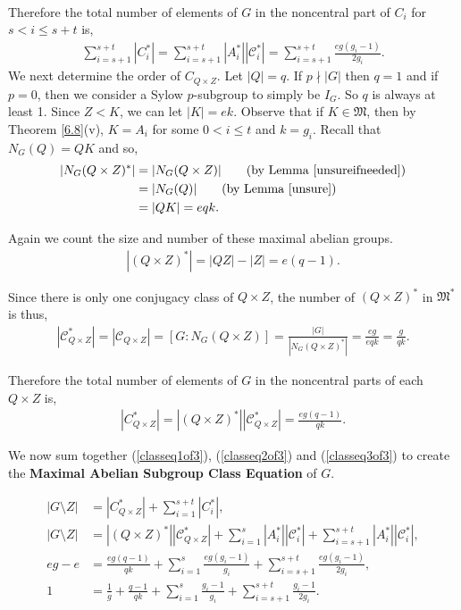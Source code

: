 \\
Therefore the total number of elements of $G$ in the noncentral part of $C_i$ for $s < i \leq s+t$ is,
\begin{align}\label{classeq2of3} \sum_{i=s+1}^{s+t} |C_i^*| = \sum_{i=s+1}^{s+t} |A_i^*| |\mathcal{C}_i^*| = \sum_{i=s+1}^{s+t} \frac{eg(g_i-1)}{2g_i}.
\end{align}
We next determine the order of $C_{Q \times Z}$. Let $|Q| = q$. If $p \nmid |G|$ then $q=1$ and if $p = 0$, then we consider a Sylow $p$-subgroup to simply be $I_G$. So $q$ is always at least 1. Since $Z < K$, we can let $|K| = ek$. Observe that if $K \in \mathfrak{M}$, then by Theorem \ref{6.8}(v), $K = A_i$ for some $0 < i \leq t$ and $k = g_i$. Recall that $N_G(Q) = QK$ and so,
\begin{align*} |N_G(Q \times Z)^*| &= |N_G(Q \times Z)|  \tag{by Lemma \ref{unsureifneeded}}
\\ &= |N_G(Q)| \tag{by Lemma \ref{unsure}}
\\ &= |QK| = eqk.
\end{align*}

Again we count the size and number of these maximal abelian groups.
\begin{align*} |(Q \times Z)^*| = |QZ| - |Z| = e(q-1).
\end{align*}

Since there is only one conjugacy class of $Q \times Z$, the number of $(Q \times Z)^*$ in $\mathfrak{M}^*$ is thus,
\begin{align*} |\mathcal{C}_{Q \times Z}^*| =  |\mathcal{C}_{Q \times Z}| =  [G: N_G(Q \times Z)] = \frac{|G|}{|N_G(Q \times Z)^*|} = \frac{eg}{eqk} = \frac{g}{qk}.
\end{align*}

Therefore the total number of elements of $G$ in the noncentral parts of each $Q \times Z$ is,
\begin{align} \label{classeq3of3} |C_{Q \times Z}^*| = |(Q \times Z)^*| |\mathcal{C}_{Q \times Z}^*| = \frac{eg(q-1)}{qk}.
\end{align}

We now sum together (\ref{classeq1of3}), (\ref{classeq2of3}) and (\ref{classeq3of3}) to create the \textbf{Maximal Abelian Subgroup Class Equation} of $G$.

\begin{align}\label{classeq} |G \! \setminus \! Z| &= |C_{Q \times Z}^*| + \sum_{i=1}^{s+t} |C_i^*|, \nonumber \\
|G \! \setminus \! Z| &= |(Q \times Z)^*| |\mathcal{C}_{Q \times Z}^*| + \sum_{i=1}^{s} |A_i^*| |\mathcal{C}_i^*| + \sum_{i=s+1}^{s+t} |A_i^*| |\mathcal{C}_i^*|, \nonumber \\
eg - e &= \frac{eg(q-1)}{qk} + \sum_{i=1}^{s} \frac{eg(g_i-1)}{g_i} + \sum_{i=s+1}^{s+t} \frac{eg(g_i-1)}{2g_i}, \nonumber \\
1 &= \frac{1}{g} + \frac{q-1}{qk} + \sum_{i=1}^{s} \frac{g_i-1}{g_i} + \sum_{i=s+1}^{s+t} \frac{g_i-1}{2g_i}.
\end{align}

